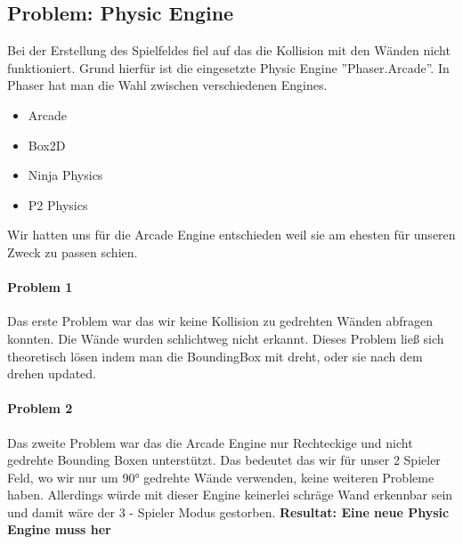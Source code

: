 \subsection{Problem: Physic Engine} 
Bei der Erstellung des Spielfeldes fiel auf das die Kollision mit den Wänden nicht funktioniert. Grund hierfür ist die eingesetzte Physic Engine ''Phaser.Arcade''.
In Phaser hat man die Wahl zwischen verschiedenen Engines.
\begin{itemize}
	\item
	      Arcade
	\item
	      Box2D
	\item
	      Ninja Physics
	\item
	      P2 Physics
\end{itemize}
Wir hatten uns für die Arcade Engine entschieden weil sie am ehesten für unseren Zweck zu passen schien.
\paragraph{Problem 1}
Das erste Problem war das wir keine Kollision zu gedrehten Wänden abfragen konnten. Die Wände wurden schlichtweg nicht erkannt.
Dieses Problem ließ sich theoretisch lösen indem man die BoundingBox mit dreht, oder sie nach dem drehen updated.
\paragraph{Problem 2}
Das zweite Problem war das die Arcade Engine nur Rechteckige und nicht gedrehte Bounding Boxen unterstützt. Das bedeutet das wir für unser 2 Spieler Feld, wo wir nur um 90° gedrehte Wände verwenden, keine weiteren Probleme haben. Allerdings würde mit dieser Engine keinerlei schräge Wand erkennbar sein und damit wäre der 3 - Spieler Modus gestorben.
\newline
\textbf{Resultat: Eine neue Physic Engine muss her}
